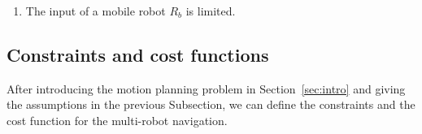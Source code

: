 \documentclass[eprint]{actapoly}
\begin{document}
\begin{enumerate}
    \item The input of a mobile robot $R_b$ is limited.
    

%    

\end{enumerate}

\subsection{Constraints and cost functions}

After introducing the motion planning problem in
Section~\ref{sec:intro} and giving the assumptions in the previous Subsection,
we can define the constraints and the cost function for the
multi-robot navigation.
\end{document}
